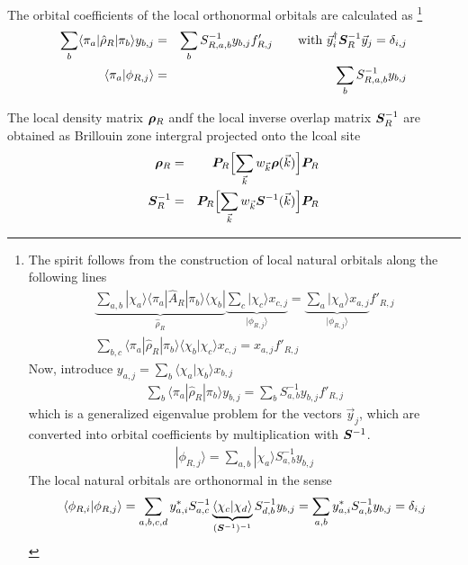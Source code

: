 \documentclass[11pt,a4paper]{report}
\begin{document}
\begin{enumerate}
The orbital coefficients of the local orthonormal orbitals are
calculated as
\footnote{The spirit follows from the construction of local natural
  orbitals along the following lines
\begin{eqnarray}
\underbrace{\sum_{a,b}|\chi_a\rangle\langle\pi_a|\hat{A}_R|\pi_b\rangle
\langle\chi_b|}_{\hat{\rho}_R}
\underbrace{\sum_c|\chi_c\rangle x_{c,j}}_{|\phi_{R,j}\rangle}
=\underbrace{\sum_a|\chi_a\rangle x_{a,j}}_{|\phi_{R,j}\rangle} f'_{R,j}
\nonumber\\
\sum_{b,c}\langle\pi_a|\hat{\rho}_R|\pi_b\rangle
\langle\chi_b|\chi_c\rangle x_{c,j}
=x_{a,j}f'_{R,j}
\end{eqnarray}
Now, introduce $y_{a,j}=\sum_b\langle\chi_a|\chi_b\rangle x_{b,j}$
\begin{eqnarray}
\sum_{b}\langle\pi_a|\hat{\rho}_R|\pi_b\rangle y_{b,j}
=\sum_b S^{-1}_{a,b}y_{b,j}f'_{R,j}
\end{eqnarray}
which is a generalized eigenvalue problem for the vectors $\vec{y}_j$,
which are converted into orbital coefficients by multiplication with
$\bm{S}^{-1}$.
\begin{eqnarray}
|\phi_{R,j}\rangle=\sum_{a,b}|\chi_a\rangle S^{-1}_{a,b} y_{b,j}
\end{eqnarray}
The local natural orbitals are orthonormal in the sense
\begin{eqnarray}
\langle\phi_{R,i}|\phi_{R,j}\rangle
=\sum_{a,b,c,d}
y^*_{a,i}S^{-1}_{a,c}
\underbrace{\langle\chi_c|\chi_d\rangle}_{(\bm{S}^{-1})^{-1}}
 S^{-1}_{d,b} y_{b,j}
=\sum_{a,b}y^*_{a,i}S^{-1}_{a,b}y_{b,j}=\delta_{i,j}
\end{eqnarray}
}
\begin{eqnarray}
\sum_{b}\langle\pi_a|\hat{\rho}_R|\pi_b\rangle y_{b,j}
&=&\sum_b S^{-1}_{R,a,b}y_{b,j}f'_{R,j}
\qquad\text{with $\vec{y}^\dagger_i \bm{S}^{-1}_R\vec{y}_{j}=\delta_{i,j}$}
\\
\langle\pi_a|\phi_{R,j}\rangle&=&\sum_{b} S^{-1}_{R,a,b} y_{b,j}
\end{eqnarray}

The local density matrix $\bm{\rho}_R$ andf the local inverse overlap
matrix $\bm{S}^{-1}_R$ are obtained as Brillouin zone intergral
projected onto the lcoal site
\begin{eqnarray}
\bm{\rho}_R&=&\bm{P}_R\Bigl[
\sum_{\vec{k}} w_{\vec{k}}\bm{\rho}(\vec{k})
\Bigr]\bm{P}_R
\nonumber\\
\bm{S}^{-1}_R&=&\bm{P}_R\Bigl[
\sum_{\vec{k}} w_{\vec{k}}\bm{S}^{-1}(\vec{k})
\Bigr]\bm{P}_R
\end{eqnarray}


\end{enumerate}
\end{document}
